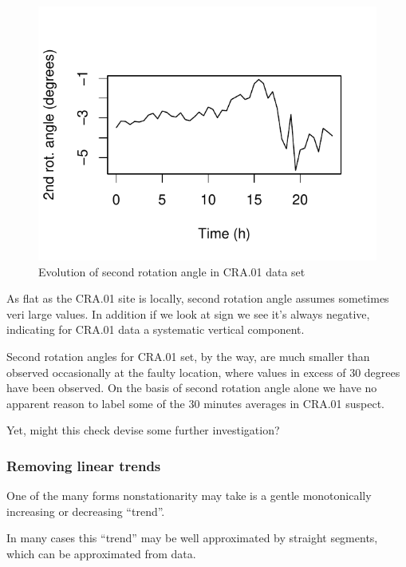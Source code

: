 \documentclass[a4paper,10pt]{book}
\begin{document}
\begin{figure}[htp]
 \centering
 \begin{center}
 \includegraphics[scale=1.1,keepaspectratio=true]{./diagrams/CRA01_Rot2.pdf}
 \end{center}
 \caption{Evolution of second rotation angle in CRA.01 data set}
 \label{fig:CRA.01 Second Angle}
\end{figure}

As flat as the CRA.01 site is locally, second rotation angle assumes sometimes veri large values. In addition if we look at sign we see it's always negative, indicating for CRA.01 data a systematic vertical component.

Second rotation angles for CRA.01 set, by the way, are much smaller than observed occasionally at the faulty location, where values in excess of 30 degrees have been observed. On the basis of second rotation angle alone we have no apparent reason to label some of the 30 minutes averages in CRA.01 suspect.

Yet, might this check devise some further investigation?

\subsubsection{Removing linear trends}

One of the many forms nonstationarity may take is a gentle monotonically increasing or decreasing ``trend''.

In many cases this ``trend'' may be well approximated by straight segments, which can be approximated from data.
\end{document}
